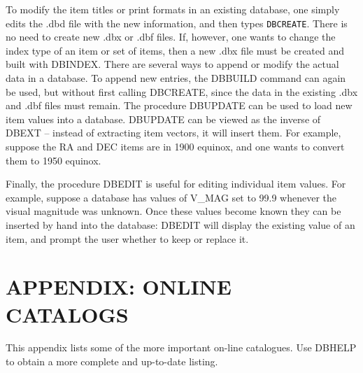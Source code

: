 To modify the item titles or print formats in
an existing database, one simply edits the .dbd file with the new information,
and then types {\tt DBCREATE}.   There is no need to create new .dbx or .dbf
files.  If, however, one wants to change the index type of an item or 
set of items, then a new .dbx file must be created and built with DBINDEX.
\exbegin
{}
\exend
There are several ways to append or modify the actual data in a database.
To append new entries, the DBBUILD command can again be used, but without
first calling DBCREATE, since the data in the existing .dbx and .dbf files
must remain.  The procedure DBUPDATE can be used to load new item values into
a database.  DBUPDATE can be viewed as the inverse of DBEXT -- instead of
extracting item vectors, it will insert them.  For example, suppose the RA and
DEC items are in 1900 equinox, and one wants to convert them to 1950 equinox.
\exbegin
{}

Finally, the procedure DBEDIT is useful for editing individual item
values.  For example, suppose a database has values of V\_MAG set to 
99.9 whenever the visual magnitude was unknown.  Once these values become
known they can be inserted by hand into the database:
\exbegin
{}
\exend
DBEDIT will display the existing value of an item, and prompt the user
whether to keep or replace it.
\section{APPENDIX:  ONLINE CATALOGS}
This appendix lists some of the more important on-line catalogues.  Use
DBHELP to obtain a more complete and up-to-date listing.   

\vspace{0.15in}

